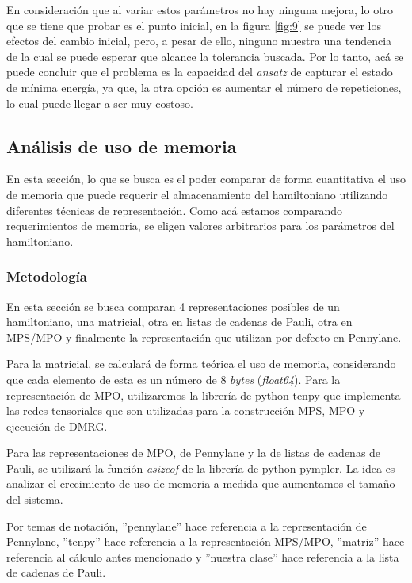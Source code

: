 En consideración que al variar estos parámetros no hay ninguna mejora, lo otro que se tiene que probar es el punto inicial, en la figura \ref{fig:9} se puede ver los efectos del cambio inicial, pero, a pesar de ello, ninguno muestra una tendencia de la cual se puede esperar que alcance la tolerancia buscada. Por lo tanto, acá se puede concluir que el problema es la capacidad del \textit{ansatz} de capturar el estado de mínima energía, ya que, la otra opción es aumentar el número de repeticiones, lo cual puede llegar a ser muy costoso.













\subsection{Análisis de uso de memoria}
En esta sección, lo que se busca es el poder comparar de forma cuantitativa el uso de memoria que puede requerir el almacenamiento del hamiltoniano utilizando diferentes técnicas de representación. Como acá estamos comparando requerimientos de memoria, se eligen valores arbitrarios para los parámetros del hamiltoniano.

\subsubsection{Metodología}
En esta sección se busca comparan 4 representaciones posibles de un hamiltoniano, una matricial, otra en listas de cadenas de Pauli, otra en MPS/MPO y finalmente la representación que utilizan por defecto en Pennylane.

Para la matricial, se calculará de forma teórica el uso de memoria, considerando que cada elemento de esta es un número de 8 \textit{bytes} (\textit{float64}). Para la representación de MPO, utilizaremos la librería de python tenpy que implementa las redes tensoriales que son utilizadas para la construcción MPS, MPO y ejecución de DMRG. 

Para las representaciones de MPO, de Pennylane y la de listas de cadenas de Pauli, se utilizará la función \textit{asizeof} de la librería de python pympler. La idea es analizar el crecimiento de uso de memoria a medida que aumentamos el tamaño del sistema.

Por temas de notación, ''pennylane'' hace referencia a la representación de Pennylane, ''tenpy'' hace referencia a la representación MPS/MPO, ''matriz'' hace referencia al cálculo antes mencionado y ''nuestra clase'' hace referencia a la lista de cadenas de Pauli.

